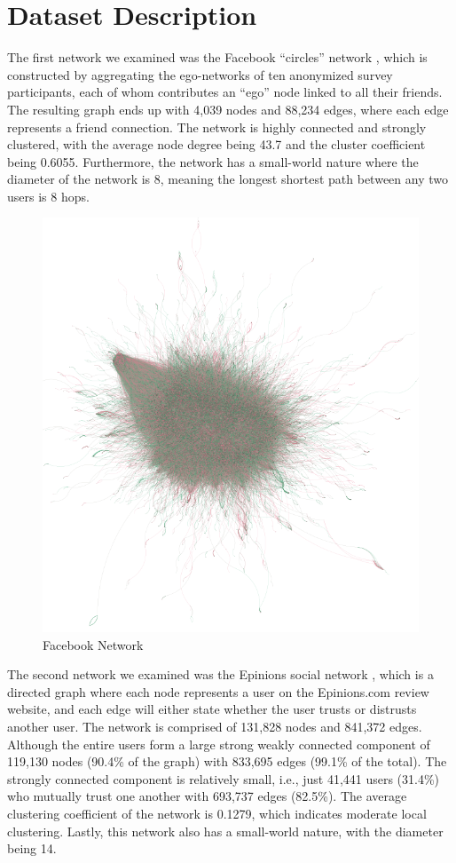 \section{Dataset Description}

The first network we examined was the Facebook “circles” network \cite{LeskovecHuttenlocherKleinberg2010}, which is constructed by aggregating the ego-networks of ten anonymized survey participants, each of whom contributes an “ego” node linked to all their friends. The resulting graph ends up with 4,039 nodes and 88,234 edges, where each edge represents a friend connection. The network is highly connected and strongly clustered, with the average node degree being 43.7 and the cluster coefficient being 0.6055. Furthermore, the network has a small-world nature where the diameter of the network is 8, meaning the longest shortest path between any two users is 8 hops. 

\begin{figure}[ht]
    \centering
    \includegraphics[width=0.8\linewidth]{figures/init_fb.png}
    \caption{Facebook Network}
    \label{fig:enter-label}
\end{figure}

The second network we examined was the Epinions social network \cite{McAuleyLeskovec2012}, which is a directed graph where each node represents a user on the Epinions.com review website, and each edge will either state whether the user trusts or distrusts another user. The network is comprised of 131,828 nodes and 841,372 edges. Although the entire users form a large strong weakly connected component of 119,130 nodes (90.4\% of the graph) with 833,695 edges (99.1\% of the total). The strongly connected component is relatively small, i.e., just 41,441 users (31.4\%) who mutually trust one another with 693,737 edges (82.5\%). The average clustering coefficient of the network is 0.1279, which indicates moderate local clustering. Lastly, this network also has a small-world nature, with the diameter being 14. 

